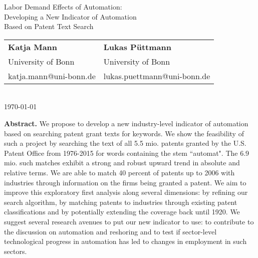 \documentclass[11pt,a4paper]{article}
\begin{document}
\vspace*{2cm}




\thispagestyle{empty}


\begin{center}
\thispagestyle{empty}
{\huge Labor Demand Effects of Automation:\\[0.2cm] Developing a New Indicator of Automation \\[0.2cm] Based on Patent Text Search}\\[1cm]
\begin{tabular}{l@{\hskip 0.6in}l}
\textbf{{\large Katja Mann}} & \textbf{{\large Lukas Püttmann}}\\
{\small University of Bonn} & {\small University of Bonn}\\
{\small katja.mann@uni-bonn.de} & {\small lukas.puettmann@uni-bonn.de}\\
\end{tabular}\\[0.7cm]
{\large \today}\\[0.7cm]
\end{center}


\vspace*{0.8cm}
\begin{center}
\begin{minipage}{0.8\textwidth}
\textbf{Abstract.} We propose to develop a new industry-level indicator of automation based on searching patent grant texts for keywords. We show the feasibility of such a project by searching the text of all 5.5 mio. patents granted by the U.S. Patent Office from 1976-2015 for words containing the stem ``automat". The 6.9 mio. such matches exhibit a strong and robust upward trend in absolute and relative terms. We are able to match 40 percent of patents up to 2006 with industries through information on the firms being granted a patent. We aim to improve this exploratory first analysis along several dimensions: by refining our search algorithm, by matching patents to industries through existing patent classifications and by potentially extending the coverage back until 1920. We suggest several research avenues to put our new indicator to use: to contribute to the discussion on automation and reshoring and to test if sector-level technological progress in automation has led to changes in employment in such sectors.
\end{minipage}
\end{center}

\end{document}
